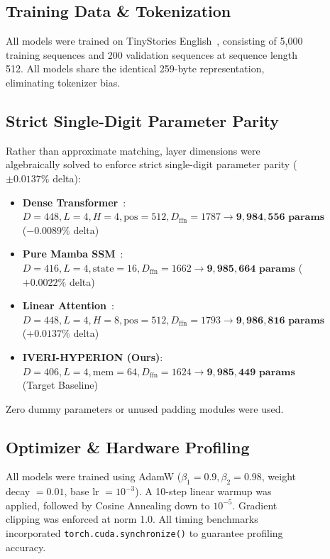 \documentclass[10pt,twocolumn,letterpaper]{article}
\begin{document}
\begin{figure}[t]
\subsection{Training Data \& Tokenization}
All models were trained on TinyStories English~\cite{eldan2023tinystories}, consisting of 5,000 training sequences and 200 validation sequences at sequence length 512. All models share the identical 259-byte representation, eliminating tokenizer bias.

\subsection{Strict Single-Digit Parameter Parity}
Rather than approximate matching, layer dimensions were algebraically solved to enforce strict single-digit parameter parity ($\pm 0.0137\%$ delta):
\begin{itemize}[leftmargin=*]
    \item \textbf{Dense Transformer}~\cite{vaswani2017attention}: $D=448, L=4, H=4, \text{pos}=512, D_{\text{ffn}}=1787 \longrightarrow \mathbf{9,984,556\text{ params}}$ ($-0.0089\%$ delta)
    \item \textbf{Pure Mamba SSM}~\cite{gu2023mamba}: $D=416, L=4, \text{state}=16, D_{\text{ffn}}=1662 \longrightarrow \mathbf{9,985,664\text{ params}}$ ($+0.0022\%$ delta)
    \item \textbf{Linear Attention}~\cite{katharopoulos2020transformers}: $D=448, L=4, H=8, \text{pos}=512, D_{\text{ffn}}=1793 \longrightarrow \mathbf{9,986,816\text{ params}}$ ($+0.0137\%$ delta)
    \item \textbf{IVERI-HYPERION (Ours)}: $D=406, L=4, \text{mem}=64, D_{\text{ffn}}=1624 \longrightarrow \mathbf{9,985,449\text{ params}}$ (Target Baseline)
\end{itemize}
Zero dummy parameters or unused padding modules were used.

\subsection{Optimizer \& Hardware Profiling}
All models were trained using AdamW ($\beta_1 = 0.9, \beta_2 = 0.98$, weight decay $= 0.01$, base lr $= 10^{-3}$). A 10-step linear warmup was applied, followed by Cosine Annealing down to $10^{-5}$. Gradient clipping was enforced at norm 1.0. All timing benchmarks incorporated \texttt{torch.cuda.synchronize()} to guarantee profiling accuracy.


\end{figure}
\end{document}
